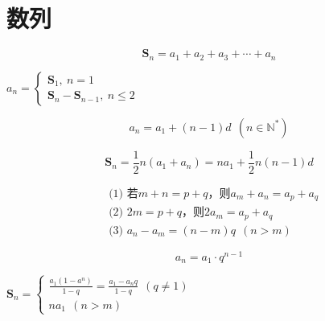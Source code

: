\documentclass[a5paper]{article}
\begin{document}
\section{{\large \textbf{数列}}}

\begin{equation*}
    \textbf{S}_n = a_1 + a_2 + a_3 + \cdots + a_n
\end{equation*}
\begin{center}
	\begin{math}
	    a_n =
        \begin{cases}
            \textbf{S}_1,~n = 1 \\
            \textbf{S}_n - \textbf{S}_{n-1},~n \le 2 
        \end{cases}
    \end{math}
\end{center}

\begin{equation*}
    a_n = a_1 + (n-1)d ~~(n \in \mathbb{N}^*)
\end{equation*}

\begin{equation*}
    \textbf{S}_n = \frac{1}{2}n(a_1 + a_n) = na_1 + \frac{1}{2}n(n-1)d
\end{equation*}

\begin{align*}
    & \text{(1) 若} m+n = p+q \text{，则} a_m + a_n = a_p + a_q \\
    & \text{(2)~} 2m = p+q \text{，则} 2a_m = a_p + a_q \\
    & \text{(3)~} a_n - a_m = (n-m)q ~~(n>m)
\end{align*}

\begin{equation*}
    a_n = a_1 \cdot q^{n-1}
\end{equation*}


\begin{center}
    \begin{math}
        \textbf{S}_n =
        \begin{cases}
            \frac{a_1(1-a^n)}{1-q} = \frac{a_1 - a_{n}q}{1-q} ~~(q \ne 1) \\
            na_1 ~~(n > m)
        \end{cases}
    \end{math}
\end{center}
\end{document}
